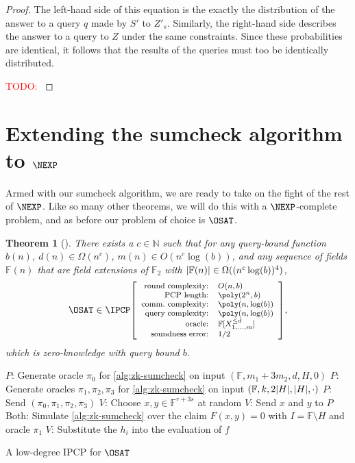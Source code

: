 \documentclass[english,12pt]{reedthesis}
\theoremstyle{plain}
\newtheorem{thm}{Theorem}[section]
\theoremstyle{definition}
\theoremstyle{remark}
\DeclarePairedDelimiter{\abs}{\lvert}{\rvert}
\newcommand{\ldipcp}[6]{%
  \ensuremath%
  \mleft[{\footnotesize\begin{array}{r l}
    \text{round complexity:} & #1 \\
    \text{PCP length:} & #2 \\
    \text{comm.\ complexity:} & #3 \\
    \text{query complexity:} & #4 \\
    \text{oracle:} & #5 \\
    \text{soundness error:} & #6
  \end{array}}\mright]%
}
\newcommand{\TODO}[1]{\textcolor{red}{TODO: #1}}
\begin{document}
\begin{proof}
  The left-hand side of this equation is the exactly the distribution of the
  answer to a query $q$ made by $S'$ to $Z'_{s}$. Similarly, the right-hand side
  describes the answer to a query to $Z$ under the same constraints. Since these
  probabilities are identical, it follows that the results of the queries must
  too be identically distributed.

  \TODO{}
\end{proof}

\section{Extending the sumcheck algorithm to $\NEXP$}

Armed with our sumcheck algorithm, we are ready to take on the fight of the rest
of $\NEXP$. Like so many other theorems, we will do this with a $\NEXP$-complete
problem, and as before our problem of choice is $\OSAT$.

\begin{thm}[{\cite[Thm.\ 14.2]{CFGS22}}]\label{thm:pzkipcp-for-nexp}
  There exists a $c \in \mathbb{N}$ such that for any query-bound function $b(n)$,
  $d(n) \in \Omega(n^{c})$, $m(n) \in O(n^{c}\log(b))$, and any sequence of fields
  $\mathbb{F}(n)$ that are field extensions of $\mathbb{F}_{2}$ with
  $\abs{\mathbb{F}(n)} \in \Omega((n^{c}\log(b))^{4})$,
  \begin{equation*}
    \OSAT \in \IPCP\ldipcp{O(n, b)}{\poly(2^{n}, b)}{\poly(n, \log(b))}{\poly(n, \log(b))}{\mathbb{F}[X_{1, \ldots, m}^{\le d}]}{1/2},
  \end{equation*}
  which is zero-knowledge with query bound $b$.
\end{thm}

\begin{algorithm}[htbp]
  $P$: Generate oracle $\pi_{0}$ for \cref{alg:zk-sumcheck} on input
  $(\mathbb{F}, m_{1}+3m_{2}, d, H, 0)$\;
  $P$: Generate oracles $\pi_{1}, \pi_{2}, \pi_{3}$ for \cref{alg:zk-sumcheck} on
  input $(\mathbb{F}, k, 2\abs{H}, \abs{H}, \cdot)$\;
  $P$: Send $(\pi_{0}, \pi_{1}, \pi_{2}, \pi_{3})$\;
  $V$: Choose $x, y \in \mathbb{F}^{r+3s}$ at random\;
  $V$: Send $x$ and $y$ to $P$\;
  Both: Simulate \cref{alg:zk-sumcheck} over the claim $F(x, y) = 0$ with
  $I = \mathbb{F} \setminus H$ and oracle $\pi_{1}$\;
  $V$: Substitute the $h_{i}$ into the evaluation of $f$\;
  \caption{A low-degree IPCP for $\OSAT$~\cite[p.\ 15:36]{CFGS22}}\label{alg:ipcp-o3sat}
\end{algorithm}
\end{document}
